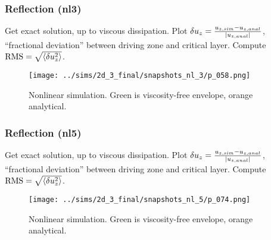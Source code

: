 \documentclass[dvipsnames]{beamer}
\DeclarePairedDelimiter\abs{\lvert}{\rvert}
\DeclarePairedDelimiter\ev{\langle}{\rangle}
\begin{document}
\begin{frame}
    \frametitle{Reflection (nl3)}

    Get exact solution, up to viscous dissipation. Plot $\delta u_z =
    \frac{u_{z,sim} - u_{z, anal}}{\abs*{u_{z, anal}}}$, ``fractional
    deviation'' between driving zone and critical layer. Compute $\mathrm{RMS} =
    \sqrt{\ev*{\delta u_z^2}}$.
    \begin{figure}[t]
        \centering
        \texttt{[image: ../sims/2d\_3\_final/snapshots\_nl\_3/p\_058.png]}
        \caption{Nonlinear simulation. Green is viscosity-free envelope, orange
        analytical.}
    \end{figure}
\end{frame}

\begin{frame}
    \frametitle{Reflection (nl5)}

    Get exact solution, up to viscous dissipation. Plot $\delta u_z =
    \frac{u_{z,sim} - u_{z, anal}}{\abs*{u_{z, anal}}}$, ``fractional
    deviation'' between driving zone and critical layer. Compute $\mathrm{RMS} =
    \sqrt{\ev*{\delta u_z^2}}$.
    \begin{figure}[t]
        \centering
        \texttt{[image: ../sims/2d\_3\_final/snapshots\_nl\_5/p\_074.png]}
        \caption{Nonlinear simulation. Green is viscosity-free envelope, orange
        analytical.}
    \end{figure}
\end{frame}
\end{document}
